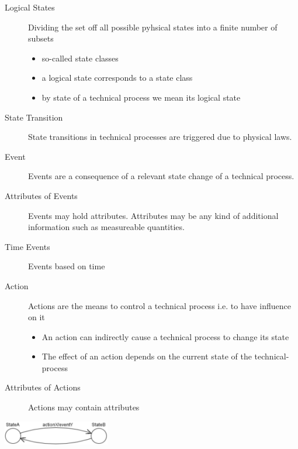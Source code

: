 \begin{description}
    \item[Logical States] Dividing the set off all possible pyhsical states into a finite number of subsets
          \begin{itemize}
              \item so-called state classes
              \item a logical state corresponds to a state class
              \item by state of a technical process we mean its logical state
          \end{itemize}
    \item[State Transition] State transitions in technical processes are triggered due to physical laws.
    \item[Event] Events are a consequence of a relevant state change of a technical process.
    \item[Attributes of Events] Events may hold attributes. Attributes may be any kind of additional information such as measureable quantities.
    \item[Time Events] Events based on time
    \item[Action] Actions are the means to control a technical process i.e. to have influence on it
          \begin{itemize}
              \item An action can indirectly cause a technical process to change its state
              \item The effect of an action depends on the current state of the technical-process
          \end{itemize}
    \item[Attributes of Actions] Actions may contain attributes
\end{description}
\includegraphics[width=0.35\textwidth]{images/UML/statechart.png}
